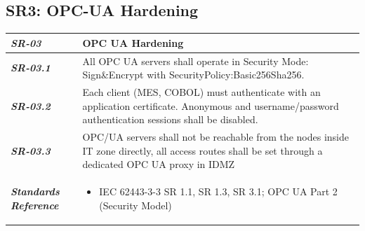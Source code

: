\documentclass[11pt,a4paper]{article}
\begin{document}
\subsection{SR3: OPC-UA Hardening}\label{SR3}
\begin{tabularx}{\textwidth}{>{\bfseries}p{2.5cm} X}
    \textit{SR-03} & \textbf{OPC UA Hardening} \vspace{0.5em}\\
\toprule
\textit{SR-03.1} &
    
    All OPC UA servers shall operate in Security Mode: Sign\&Encrypt with SecurityPolicy:Basic256Sha256.
    \vspace{0.5em}
\\
\textit{SR-03.2} &
    Each client (MES, COBOL) must authenticate with an application certificate. Anonymous and username/password authentication sessions shall be disabled.
    \vspace{0.5em}
    \\
\textit{SR-03.3} &
    OPC/UA servers shall not be reachable from the nodes inside IT zone directly, all access routes shall be set through a dedicated OPC UA proxy in IDMZ
    \vspace{0.5em}
    \\
\midrule
    \textit{Standards Reference} &
\begin{itemize}[label=-, noitemsep, topsep=0pt, leftmargin=*]
    \item IEC 62443-3-3 SR 1.1, SR 1.3, SR 3.1; OPC UA Part 2 (Security Model)
\end{itemize} \vspace{1em} \\ 
\end{tabularx}
\vspace{2em}

\end{document}
